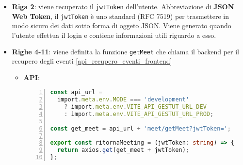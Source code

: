 \begin{itemize}
    \item \textbf{Riga 2}: viene recuperato il \texttt{jwtToken} dell'utente. Abbreviazione di \textbf{JSON Web Token}, 
    il \texttt{jwtToken} è uno standard (RFC 7519) per trasmettere in modo sicuro dei dati sotto forma di oggeto JSON. \cite{jwtToken}
    Viene generato quando l'utente effettua il login e contiene informazioni utili riguardo a esso.
    \item \textbf{Righe 4-11}: viene definita la funzione \texttt{getMeet} che chiama il backend per il recupero degli eventi \ref{api_recupero_eventi_frontend}
        \begin{itemize}
            \item \textbf{API}:
            \begin{lstlisting}[language=typescript, frame=lines, basicstyle=\ttfamily\scriptsize, numbers=left, 
                label={api_recupero_eventi_frontend}, caption={API definita a frontend per il recupero degli eventi}]
const api_url =
  import.meta.env.MODE === 'development'
    ? import.meta.env.VITE_API_GESTUT_URL_DEV
    : import.meta.env.VITE_API_GESTUT_URL_PROD;

const get_meet = api_url + 'meet/getMeet?jwtToken=';

export const ritornaMeeting = (jwtToken: string) => {
  return axios.get(get_meet + jwtToken);
};

            \end{lstlisting}
        \end{itemize}


\end{itemize}
